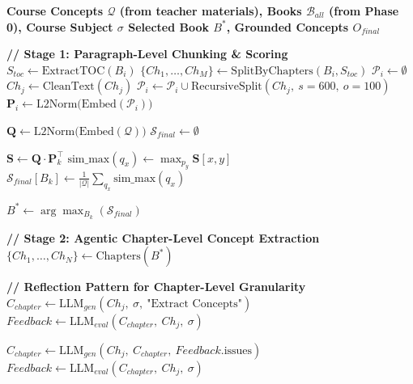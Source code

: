 \begin{algorithm}
\caption{\textbf{Phase 1: Chunking \& Agentic Extraction for Book Selection}}
\begin{algorithmic}[1]
\bfseries
\Require Course Concepts $\mathcal{Q}$ (from teacher materials), Books $\mathcal{B}_{all}$ (from Phase 0), Course Subject $\sigma$
\Ensure Selected Book $B^*$, Grounded Concepts $O_{final}$

\State \textbf{// Stage 1: Paragraph-Level Chunking \& Scoring}
    \State $S_{toc} \leftarrow \text{ExtractTOC}(B_i)$
    \State $\{Ch_1, \dots, Ch_M\} \leftarrow \text{SplitByChapters}(B_i, S_{toc})$
    \State $\mathcal{P}_i \leftarrow \emptyset$
        \State $Ch_j \leftarrow \text{CleanText}(Ch_j)$
        \State $\mathcal{P}_i \leftarrow \mathcal{P}_i \cup \text{RecursiveSplit}(Ch_j,\ s{=}600,\ o{=}100)$
    \EndFor
    \State $\mathbf{P}_i \leftarrow \text{L2Norm}\bigl(\text{Embed}(\mathcal{P}_i)\bigr)$
\EndFor

\State $\mathbf{Q} \leftarrow \text{L2Norm}\bigl(\text{Embed}(\mathcal{Q})\bigr)$
\State $\mathcal{S}_{final} \leftarrow \emptyset$

    \State $\mathbf{S} \leftarrow \mathbf{Q} \cdot \mathbf{P}_k^\top$
        \State $\text{sim\_max}(q_x) \leftarrow \max_{p_y} \mathbf{S}[x, y]$
    \EndFor
    \State $\mathcal{S}_{final}[B_k] \leftarrow \frac{1}{|\mathcal{Q}|} \sum_{q_x} \text{sim\_max}(q_x)$
\EndFor

\State $B^* \leftarrow \arg\max_{B_k} (\mathcal{S}_{final})$

\State
\State \textbf{// Stage 2: Agentic Chapter-Level Concept Extraction}
\State $\{Ch_1, \dots, Ch_N\} \leftarrow \text{Chapters}(B^*)$

    \State \textbf{// Reflection Pattern for Chapter-Level Granularity}
    \State $C_{chapter} \leftarrow \text{LLM}_{gen}(Ch_j,\ \sigma,\ \text{"Extract Concepts"})$
    \State $Feedback \leftarrow \text{LLM}_{eval}(C_{chapter},\ Ch_j,\ \sigma)$

        \State $C_{chapter} \leftarrow \text{LLM}_{gen}(Ch_j,\ C_{chapter},\ Feedback.\text{issues})$
        \State $Feedback \leftarrow \text{LLM}_{eval}(C_{chapter},\ Ch_j,\ \sigma)$
    \EndWhile


\end{algorithmic}
\end{algorithm}
